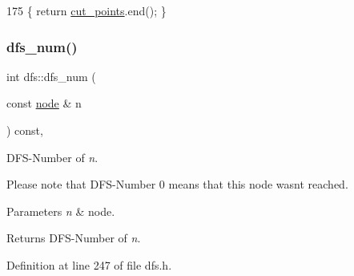 \begin{DoxyCode}
175     \{ \textcolor{keywordflow}{return} \mbox{\hyperlink{classbiconnectivity_a776f4f2d5654ef6836aeb34690fdadc5}{cut\_points}}.end(); \}
\end{DoxyCode}
\mbox{\label{classdfs_a315f16831a0bd333960e87e045cb37c8}} 
\subsubsection{\texorpdfstring{dfs\+\_\+num()}{dfs\_num()}}
{\footnotesize\ttfamily int dfs\+::dfs\+\_\+num (\begin{DoxyParamCaption}\item[{const \mbox{\hyperlink{classnode}{node}} \&}]{n }\end{DoxyParamCaption}) const\hspace{0.3cm}{\ttfamily [inline]}, {\ttfamily [inherited]}}



D\+F\+S-\/\+Number of {\itshape n}. 

Please note that D\+F\+S-\/\+Number 0 means that this node wasn\textquotesingle{}t reached.


\begin{DoxyParams}{Parameters}
{\em n} & node. \\
\hline
\end{DoxyParams}
\begin{DoxyReturn}{Returns}
D\+F\+S-\/\+Number of {\itshape n}. 
\end{DoxyReturn}


Definition at line 247 of file dfs.\+h.


